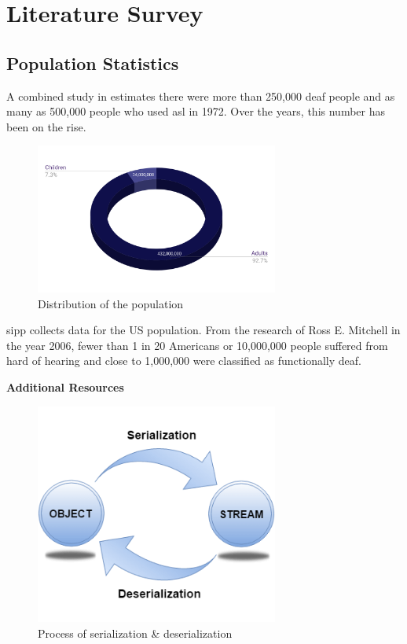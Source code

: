 \documentclass[twocolumn]{article}
\begin{document}
\section{Literature Survey}

\subsection{Population Statistics}
A combined study in \cite{mitchell2006many} estimates there were more than 
250,000 deaf people and as many as 500,000 people who used \gls{asl} in 1972. 
Over the years, this number has been on the rise.

\begin{figure}[h]
\centering
\includegraphics[width=8cm]{./figures/Distribution of the population}
\caption{Distribution of the population}
\end{figure}

\gls{sipp} collects data for the US population. From the research of 
Ross E. Mitchell \cite{mitchell2006many} in the year 2006, fewer than 1 in 20 
Americans or 10,000,000 people suffered from hard of hearing and close to 
1,000,000 were classified as functionally deaf.




\listoffigures
\listoftables

\glsaddall
\setlength{\glsdescwidth}{0.8\textwidth}
\printglossary[type=\acronymtype,title=List Of Abbreviations]

\clearpage
\LARGE{\textbf{Additional Resources}}

\begin{figure}[h]
\centering
\includegraphics[width=8cm]{./figures/serialization and deserialization}
\caption{Process of serialization \& deserialization}
\end{figure}
\end{document}
